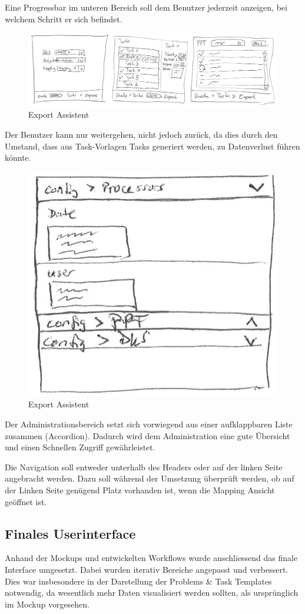 		Eine Progressbar im unteren Bereich soll dem Benutzer jederzeit anzeigen, bei welchem Schritt er sich befindet.
		
		\begin{figure}[H]
			\includegraphics[width=\linewidth]{interfacesAndProtocols/media/img/exportWorkflow.jpg}
			\caption{Export Assistent}
			\label{fig:exportAssistent}
		\end{figure}	
		
		Der Benutzer kann nur weitergehen, nicht jedoch zurück, da dies durch den Umstand, 
		dass aus Task-Vorlagen Tasks generiert werden, 
		zu Datenverlust führen könnte.
		
		\begin{figure}[H]
			\centering
			\includegraphics[width=0.3\linewidth]{interfacesAndProtocols/media/img/administration.jpg}
			\caption{Export Assistent}
			\label{fig:administration}
		\end{figure}	
		
		Der Administrationsbereich setzt sich vorwiegend aus einer aufklappbaren Liste zusammen (Accordion). Dadurch wird dem Administration eine gute Übersicht und einen Schnellen Zugriff gewährleistet.
		
		Die Navigation soll entweder unterhalb des Headers oder auf der linken Seite angebracht werden. Dazu soll während der Umsetzung überprüft werden, ob auf der Linken Seite genügend Platz vorhanden ist, wenn die Mapping Ansicht geöffnet ist.
		
		
	\subsection{Finales Userinterface}
	
		Anhand der Mockups und entwickelten Workflows wurde anschliessend das finale Interface umgesetzt.
		Dabei wurden iterativ Bereiche angepasst und verbessert.
		Dies war insbesondere in der Darstellung der Problems \& Task Templates notwendig, 
		da wesentlich mehr Daten visualisiert werden sollten, als ursprünglich im Mockup vorgesehen.
		
